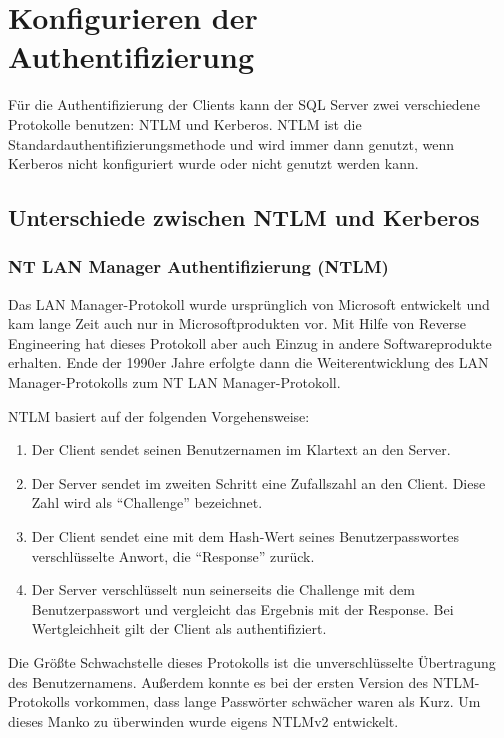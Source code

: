     \section{Konfigurieren der Authentifizierung}
      Für die Authentifizierung der Clients kann der SQL Server zwei
      verschiedene Protokolle benutzen: NTLM und Kerberos. NTLM ist die
      Standardauthentifizierungsmethode und wird immer dann genutzt, wenn
      Kerberos nicht konfiguriert wurde oder nicht genutzt werden kann.
      \subsection{Unterschiede zwischen NTLM und Kerberos}
        \subsubsection{NT LAN Manager Authentifizierung (NTLM)}
          Das LAN Manager-Protokoll wurde ursprünglich von Microsoft entwickelt
          und kam lange Zeit auch nur in Microsoftprodukten vor. Mit Hilfe von
          Reverse Engineering hat dieses Protokoll aber auch Einzug in andere
          Softwareprodukte erhalten. Ende der 1990er Jahre erfolgte dann die
          Weiterentwicklung des LAN Manager-Protokolls zum NT LAN
          Manager-Protokoll.
          
          NTLM basiert auf der folgenden Vorgehensweise:
          \begin{enumerate}
            \item Der Client sendet seinen Benutzernamen im Klartext an den
            Server.
            \item Der Server sendet im zweiten Schritt eine Zufallszahl an den
            Client. Diese Zahl wird als \enquote{Challenge} bezeichnet.
            \item Der Client sendet eine mit dem Hash-Wert seines
            Benutzerpasswortes verschlüsselte Anwort, die \enquote{Response}
            zurück.
            \item Der Server verschlüsselt nun seinerseits die Challenge mit dem
            Benutzerpasswort und vergleicht das Ergebnis mit der Response. Bei
            Wertgleichheit gilt der Client als authentifiziert.
          \end{enumerate}
          Die Größte Schwachstelle dieses Protokolls ist die unverschlüsselte
          Übertragung des Benutzernamens. Außerdem konnte es bei der ersten
          Version des NTLM-Protokolls vorkommen, dass lange Passwörter schwächer
          waren als Kurz. Um dieses Manko zu überwinden wurde eigens NTLMv2
          entwickelt.

